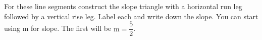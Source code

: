 \documentclass[12pt, a4paper, addpoints]{exam}
\begin{document}
\begin{questions}
\begin{multicols}{3}
\end{multicols}





\newpage

\renewcommand{\smallspace}{\vspace{4mm}}



\renewcommand{\smallspace}{\vspace{4mm}}
\question For these line segments construct the slope triangle with a  horizontal   run leg followed by a vertical rise leg. Label each and write down the slope. You can start using m for slope.  The first will be $\text{m}=\dfrac{5}{2}$.  
\begin{multicols}{3}
\end{multicols}
\end{questions}
\end{document}
